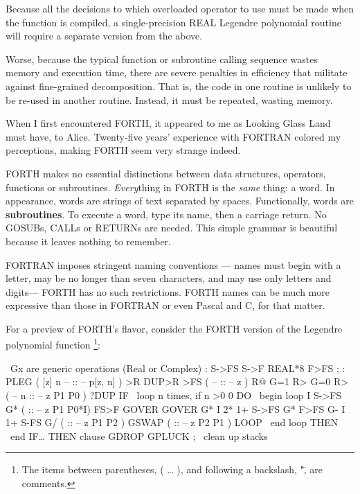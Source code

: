 Because all the decisions to which overloaded operator to use must be made when the function is compiled, a single-precision REAL Legendre polynomial routine will require a separate version from the above.

Worse, because the typical function or subroutine calling sequence wastes memory and execution time, there are severe penalties in efficiency that militate against fine-grained decomposition. That is, the code in one routine is unlikely to be re-used in another routine. Instead, it must be repeated, wasting memory. 


When I first encountered FORTH, it appeared to me as Looking Glass Land must have, to Alice. Twenty-five years' experience with FORTRAN colored my perceptions, making FORTH seem very strange indeed.

FORTH makes no essential distinctions between data structures, operators, functions or subroutines. \textit{Every}thing in FORTH is the 
\textit{same} thing: a word. In appearance, words are strings of text separated by spaces. Functionally, words are \textbf{subroutines}. To execute a word, type its name, then a carriage return. No GOSUBs, CALLs or RETURNs are needed. This simple grammar is beautiful because it leaves nothing to remember.

FORTRAN imposes stringent naming conventions — names must begin with a letter, may be no longer than seven characters, and may use only letters and digits— FORTH has no such restrictions. FORTH names can be much more expressive than those in FORTRAN or even Pascal and C, for that matter.

For a preview of FORTH's flavor, consider the FORTH version of the Legendre polynomial function \footnote{The items between parentheses, ( … ), and following a backslash, "\", are comments.}:

\begin{code}
\ Gx are generic operations (Real or Complex)
: S->FS    S->F    REAL*8    F>FS ;
: PLEG        ( [z] n -- :: -- p[z, n] )
    >R DUP>R  >FS    ( -- :: -- z )
    R@ G=1 R> G=0 R> ( -- n :: -- z P1 P0 )
    ?DUP IF          \ loop n times, if n >0
    0 DO             \ begin loop
       I S->FS G*    ( :: -- z P1 P0*I)
       FS>F GOVER GOVER
       G* I 2* 1+  S->FS
       G* F>FS G-
       I 1+ S-FS  G/ ( :: -- z P1 P2 )
       GSWAP         ( :: -- z P2 P1 )
    LOOP             \ end loop
    THEN             \ end IF… THEN clause
    GDROP   GPLUCK ; \ clean up stacks
\end{code}

